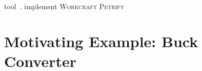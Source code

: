 \documentclass[british, journal]{IEEEtran}
\newcommand{\noun}[1]{\textsc{#1}}
\begin{document}


tool~\cite{2016_concepts_github}.
implement
\noun{Workcraft}
\noun{Petrify}


\section{Motivating Example: Buck Converter\label{sec:Motivating Example}}
\end{document}
